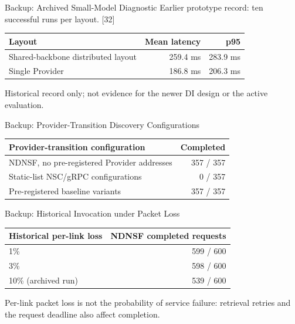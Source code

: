\begin{frame}{Backup: Archived Small-Model Diagnostic}
\small Earlier prototype record: ten successful runs per layout. [32]
\par\vspace{4mm}
\begin{tabularx}{\linewidth}{Xrr}
\toprule Layout & Mean latency & p95\\\midrule
Shared-backbone distributed layout & 259.4 ms & 283.9 ms\\\midrule
Single Provider & 186.8 ms & 206.3 ms\\\bottomrule
\end{tabularx}
\vspace{4mm}
\vspace{2mm}\scriptsize Historical record only; not evidence for the newer DI design or the active evaluation.
\end{frame}

\begin{frame}{Backup: Provider-Transition Discovery Configurations}
\small
\begin{tabularx}{\linewidth}{Xr}
\toprule Provider-transition configuration & Completed\\\midrule
NDNSF, no pre-registered Provider addresses & 357 / 357\\\midrule
Static-list NSC/gRPC configurations & 0 / 357\\\midrule
Pre-registered baseline variants & 357 / 357\\\bottomrule
\end{tabularx}
\vspace{5mm}
\end{frame}

\begin{frame}{Backup: Historical Invocation under Packet Loss}
\small
\begin{tabularx}{\linewidth}{Xr}
\toprule Historical per-link loss & NDNSF completed requests\\\midrule
1\% & 599 / 600\\\midrule
3\% & 598 / 600\\\midrule
10\% (archived run) & 539 / 600\\\bottomrule
\end{tabularx}
\vspace{4mm}
\vspace{2mm}\scriptsize Per-link packet loss is not the probability of service failure: retrieval retries and the request deadline also affect completion.
\end{frame}

